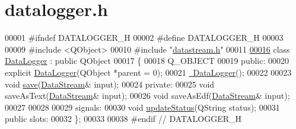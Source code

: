 \hypertarget{datalogger_8h_source}{}\section{datalogger.\+h}
\label{datalogger_8h_source}

\begin{DoxyCode}
00001 \textcolor{preprocessor}{#ifndef DATALOGGER\_H}
00002 \textcolor{preprocessor}{#define DATALOGGER\_H}
00003 
00009 \textcolor{preprocessor}{#include <QObject>}
00010 \textcolor{preprocessor}{#include "\hyperlink{datastream_8h}{datastream.h}"}
00011 
\hypertarget{datalogger_8h_source.tex_l00016}{}\hyperlink{classDataLogger}{00016} \textcolor{keyword}{class }\hyperlink{classDataLogger}{DataLogger} : \textcolor{keyword}{public} QObject
00017 \{
00018     Q\_OBJECT
00019 \textcolor{keyword}{public}:
00020     \textcolor{keyword}{explicit} \hyperlink{classDataLogger_a4b383913e0fd834ff9b0d8bbd295c2db}{DataLogger}(QObject *parent = 0);
00021     \hyperlink{classDataLogger_a9aaff109f3e7749a0a0a0313655da50a}{~DataLogger}();
00022 
00023     \textcolor{keywordtype}{void} \hyperlink{classDataLogger_a17296a2d3088e979c9b1f48e68caf9ad}{save}(\hyperlink{classDataStream}{DataStream}& input); 
00024 \textcolor{keyword}{private}:
00025     \textcolor{keywordtype}{void} saveAsText(\hyperlink{classDataStream}{DataStream}& input); 
00026     \textcolor{keywordtype}{void} saveAsEdf(\hyperlink{classDataStream}{DataStream}& input); 
00027 
00028 
00029 signals:
00030     \textcolor{keywordtype}{void} \hyperlink{classDataLogger_a59e42d6e77f7fd97ea23529abb6c275c}{updateStatus}(QString status); 
00031 \textcolor{keyword}{public} slots:
00032 \};
00033 
00038 \textcolor{preprocessor}{#endif // DATALOGGER\_H}
\end{DoxyCode}
